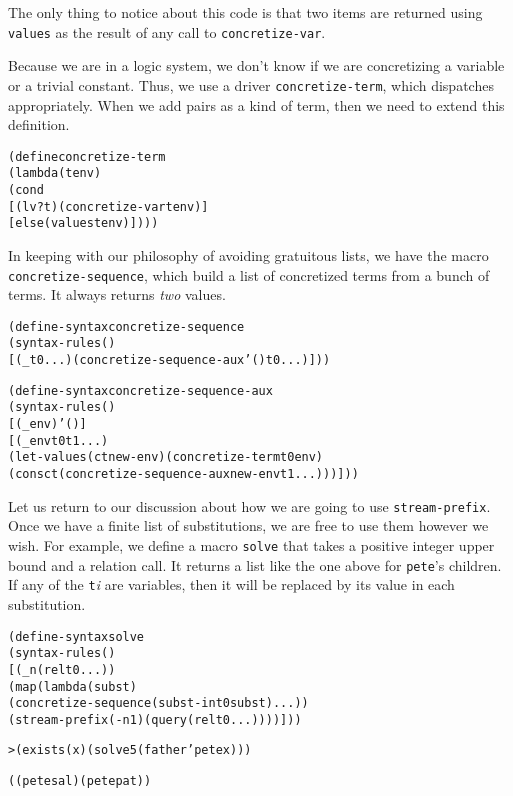 The only thing to notice about this code is that two items are returned
using \texttt{values} as the result of any call to
\texttt{concretize-var}.

Because we are in a logic system, we don't know if we are concretizing
a variable or a trivial constant.  Thus, we use a driver
\texttt{concretize-term}, which dispatches appropriately.  When we add
pairs as a kind of term, then we need to extend this definition.

\begin{alltt}
(define concretize-term
  (lambda (t env)
    (cond
      [(lv? t) (concretize-var t env)]
      [else (values t env)])))
\end{alltt}

In keeping with our philosophy of avoiding gratuitous lists, we have
the macro \texttt{concretize-sequence}, which build a list of
concretized terms from a bunch of terms.  It always returns \emph{two}
values.

\begin{alltt}
(define-syntax concretize-sequence
  (syntax-rules ()
    [(_ t0 ...) (concretize-sequence-aux '() t0 ...)]))

(define-syntax concretize-sequence-aux
  (syntax-rules ()
    [(_ env) '()]
    [(_ env t0 t1 ...)
     (let-values (ct new-env) (concretize-term t0 env)
       (cons ct (concretize-sequence-aux new-env t1 ...)))]))
\end{alltt}

Let us return to our discussion about how we are going to use
\texttt{stream-prefix}.  Once we have a finite list of substitutions,
we are free to use them however we wish. For example, we define a
macro \texttt{solve} that takes a positive integer upper bound and a
relation call.  It returns a list like the one above for
\texttt{pete}'s children.  If any of the \texttt{t}\emph{i} are
variables, then it will be replaced by its value in each substitution.

\begin{alltt}
(define-syntax solve
  (syntax-rules ()
    [(_ n (rel t0 ...))
     (map (lambda (subst)
            (concretize-sequence (subst-in t0 subst) ...))
       (stream-prefix (- n 1) (query (rel t0 ...))))]))
\end{alltt}

\begin{alltt}
> (exists (x) (solve 5 (father 'pete x)))

((pete sal) (pete pat))
\end{alltt}

